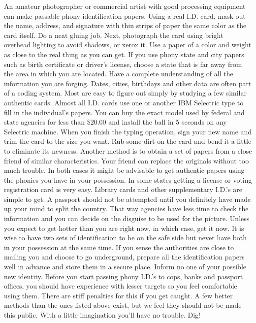 \documentclass[11pt,twoside,a4paper]{book}
\begin{document}
An amateur photographer or commercial artist with good processing equipment can make passable phony identification papers. Using a real I.D. card, mask out the name, address, and signature with thin strips of paper the same color as the card itself. Do a neat gluing job. Next, photograph the card using bright overhead lighting to avoid shadows, or xerox it. Use a paper of a color and weight as close to the real thing as you can get. If you use phony state and city papers such as birth certificate or driver's license, choose a state that is far away from the area in which you are located. Have a complete understanding of all the information you are forging. Dates, cities, birthdays and other data are often part of a coding system. Most are easy to figure out simply by studying a few similar authentic cards. Almost all I.D. cards use one or another IBM Selectric type to fill in the individual's papers. You can buy the exact model used by federal and state agencies for less than \$20.00 and install the ball in 5 seconds on any Selectric machine. When you finish the typing operation, sign your new name and trim the card to the size you want. Rub some dirt on the card and bend it a little to eliminate its newness. Another method is to obtain a set of papers from a close friend of similar characteristics. Your friend can replace the originals without too much trouble. In both cases it might be advisable to get authentic papers using the phonies you have in your possession. In some states getting a license or voting registration card is very easy. Library cards and other supplementary I.D.'s are simple to get. A passport should not be attempted until you definitely have made up your mind to split the country. That way agencies have less time to check the information and you can decide on the disguise to be used for the picture. Unless you expect to get hotter than you are right now, in which case, get it now. It is wise to have two sets of identification to be on the safe side but never have both in your possession at the same time. If you sense the authorities are close to mailing you and choose to go underground, prepare all the identification papers well in advance and store them in a secure place. Inform no one of your possible new identity. Before you start passing phony I.D.'s to cops, banks and passport offices, you should have experience with lesser targets so you feel comfortable using them. There are stiff penalties for this if you get caught. A few better methods than the ones listed above exist, but we feel they should not be made this public. With a little imagination you'll have no trouble. Dig!
\end{document}

